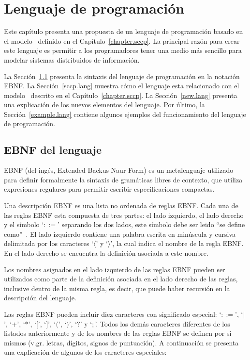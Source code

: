 
\chapter{Lenguaje de programaci\'on}
\label{chapter.lang}

Este cap\'itulo presenta una propuesta de un lenguaje de programaci\'on basado en el modelo \SCCP \ definido en el Cap\'itulo~\ref{chapter.sccp}. La principal raz\'on para crear este lenguaje es permitir a los programadores tener una medio m\'as sencillo para modelar sistemas distribuidos de informaci\'on.  

La Secci\'on~\ref{ebnf.lang} presenta la sintaxis del lenguaje de programaci\'on en la notaci\'on EBNF. La Secci\'on~\ref{sccp.lang} muestra c\'omo el lenguaje esta relacionado con el modelo \SCCP \ descrito en el Cap\'itulo~\ref{chapter.sccp}. La Secci\'on~\ref{new.lang} presenta una explicaci\'on de los nuevos elementos del lenguaje. Por \'ultimo, la Secci\'on~\ref{example.lang} contiene algunos ejemplos del funcionamiento del lenguaje de programaci\'on.

\section{EBNF del lenguaje}
\label{ebnf.lang}

EBNF (del ing\'es, Extended Backus-Naur Form) es un metalenguaje utilizado para definir formalmente la sintaxis de gram\'aticas libres de contexto, que utiliza expresiones regulares para permitir escribir especificaciones compactas. 

Una descripci\'on EBNF es una lista no ordenada de reglas EBNF. Cada una de las reglas EBNF esta compuesta de tres partes: el lado izquierdo, el lado derecho y el s\'imbolo `$::=$' separando los dos lados, este s\'imbolo debe ser leido ``se define como''~\cite{ebnfdoc}. El lado izquierdo contiene una palabra escrita en min\'uscula y cursiva delimitada por los caracteres `$\langle$' y `$\rangle$', la cual indica el nombre de la regla EBNF. En el lado derecho se encuentra la definici\'on asociada a este nombre. 

Los nombres asignados en el lado izquierdo de las reglas EBNF pueden ser utilizados como parte de la definici\'on asociada en el lado derecho de las reglas, inclusive dentro de la misma regla, es decir, que puede haber recursi\'on en la descripci\'on del lenguaje.

Las reglas EBNF pueden incluir diez caracteres con significado especial: `$::=$', `$|$', `$+$', `$*$', `$[$', `$]$', `$($', `$)$', `$?$' y `$;$'. Todos los dem\'as caracteres diferentes de los listados anteriormente y de los nombres de las reglas EBNF se definen por si mismos (v.gr. letras, d\'igitos, signos de puntuaci\'on). A continuaci\'on se presenta una explicaci\'on de algunos de los caracteres especiales:

